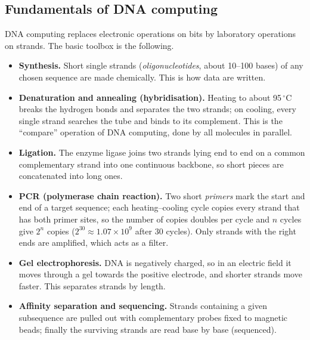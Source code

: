 \subsection{Fundamentals of DNA computing \new}

DNA computing replaces electronic operations on bits by laboratory operations on strands. The basic toolbox is the following.
\begin{itemize}
  \item \textbf{Synthesis.} Short single strands (\emph{oligonucleotides}, about 10--100 bases) of any chosen sequence are made chemically. This is how data are written.
  \item \textbf{Denaturation and annealing (hybridisation).} Heating to about 95\,$^\circ$C breaks the hydrogen bonds and separates the two strands; on cooling, every single strand searches the tube and binds to its complement. This is the ``compare'' operation of DNA computing, done by all molecules in parallel.
  \item \textbf{Ligation.} The enzyme ligase joins two strands lying end to end on a common complementary strand into one continuous backbone, so short pieces are concatenated into long ones.
  \item \textbf{PCR (polymerase chain reaction).} Two short \emph{primers} mark the start and end of a target sequence; each heating--cooling cycle copies every strand that has both primer sites, so the number of copies doubles per cycle and $n$ cycles give $2^n$ copies ($2^{30} \approx 1.07 \times 10^9$ after 30 cycles). Only strands with the right ends are amplified, which acts as a filter.
  \item \textbf{Gel electrophoresis.} DNA is negatively charged, so in an electric field it moves through a gel towards the positive electrode, and shorter strands move faster. This separates strands by length.
  \item \textbf{Affinity separation and sequencing.} Strands containing a given subsequence are pulled out with complementary probes fixed to magnetic beads; finally the surviving strands are read base by base (sequenced).
\end{itemize}

